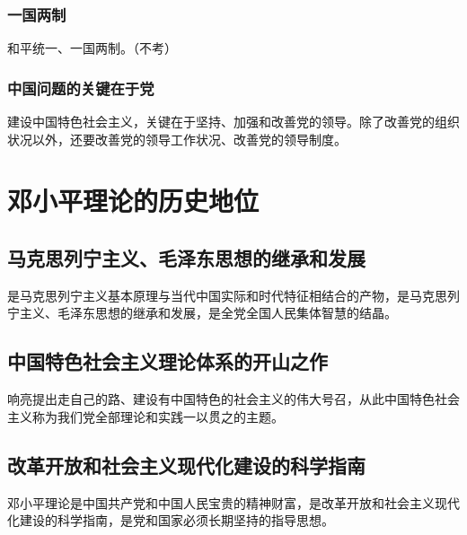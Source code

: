         \subsubsection{一国两制}
        和平统一、一国两制。（不考）

        \subsubsection{中国问题的关键在于党}
        建设中国特色社会主义，关键在于坚持、加强和改善党的领导。除了改善党的组织状况以外，还要改善党的领导工作状况、改善党的领导制度。


\section{邓小平理论的历史地位}
    \subsection{马克思列宁主义、毛泽东思想的继承和发展}
        是马克思列宁主义基本原理与当代中国实际和时代特征相结合的产物，是马克思列宁主义、毛泽东思想的继承和发展，是全党全国人民集体智慧的结晶。

    \subsection{中国特色社会主义理论体系的开山之作}
        响亮提出走自己的路、建设有中国特色的社会主义的伟大号召，从此中国特色社会主义称为我们党全部理论和实践一以贯之的主题。

    \subsection{改革开放和社会主义现代化建设的科学指南}
        邓小平理论是中国共产党和中国人民宝贵的精神财富，是改革开放和社会主义现代化建设的科学指南，是党和国家必须长期坚持的指导思想。